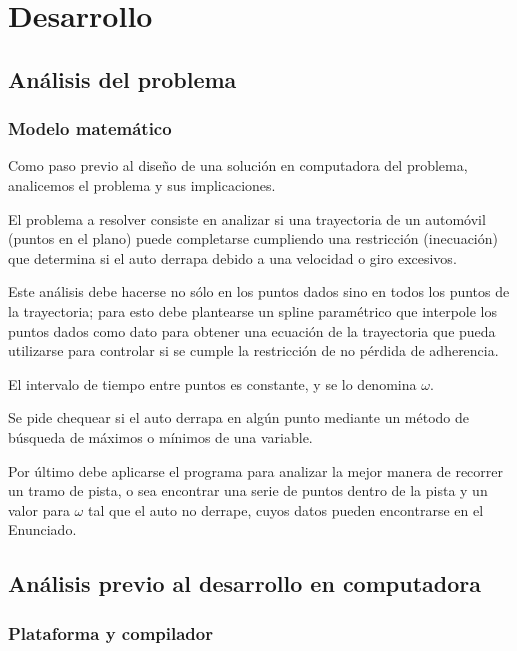 \section{Desarrollo}

\subsection{An\'alisis del problema}
	
		\subsubsection{Modelo matem\'atico}
		
		Como paso previo al dise\~no de una soluci\'on en computadora del problema, analicemos el problema y sus implicaciones.

		El problema a resolver consiste en analizar si una trayectoria de un autom\'ovil (puntos en el plano) puede completarse cumpliendo una restricci\'on (inecuaci\'on) que determina si el auto derrapa debido a una velocidad o giro excesivos.

		Este an\'alisis debe hacerse no s\'olo en los puntos dados sino en todos los puntos de la trayectoria; para esto debe plantearse un spline param\'etrico que interpole los puntos dados como dato para obtener una ecuaci\'on de la trayectoria que pueda utilizarse para controlar si se cumple la restricci\'on de no p\'erdida de adherencia.

		El intervalo de tiempo entre puntos es constante, y se lo denomina $\omega$.

		Se pide chequear si el auto derrapa en alg\'un punto mediante un m\'etodo de b\'usqueda de m\'aximos o m\'inimos de una variable.

		Por \'ultimo debe aplicarse el programa para analizar la mejor manera de recorrer un tramo de pista, o sea encontrar una serie de puntos dentro de la pista y un valor para $\omega$ tal que el auto no derrape, cuyos datos pueden encontrarse en el Enunciado.

\newpage

\subsection{An\'alisis previo al desarrollo en computadora}

		\subsubsection{Plataforma y compilador}


